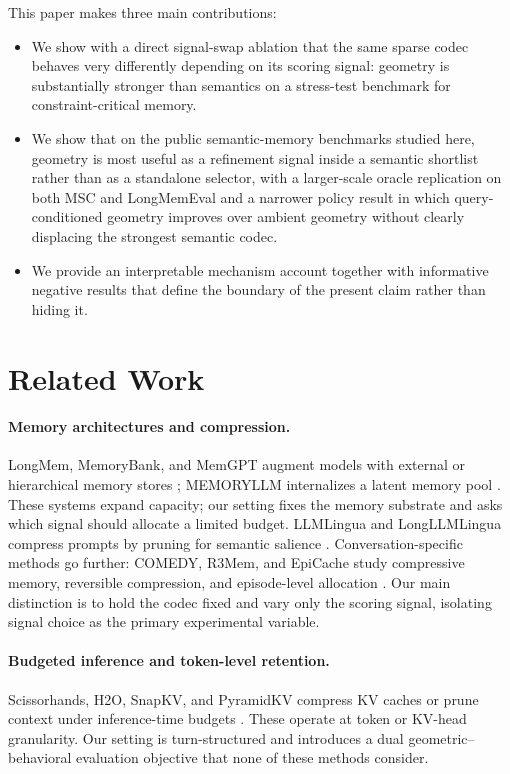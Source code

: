 \documentclass[11pt]{article}
\begin{document}
This paper makes three main contributions:
\begin{itemize}[leftmargin=1.25em]
    \item We show with a direct signal-swap ablation that the same sparse codec behaves very differently depending on its scoring signal: geometry is substantially stronger than semantics on a stress-test benchmark for constraint-critical memory.
    \item We show that on the public semantic-memory benchmarks studied here, geometry is most useful as a refinement signal inside a semantic shortlist rather than as a standalone selector, with a larger-scale oracle replication on both MSC and LongMemEval and a narrower policy result in which query-conditioned geometry improves over ambient geometry without clearly displacing the strongest semantic codec.
    \item We provide an interpretable mechanism account together with informative negative results that define the boundary of the present claim rather than hiding it.
\end{itemize}

\section{Related Work}
\paragraph{Memory architectures and compression.}
LongMem, MemoryBank, and MemGPT augment models with external or hierarchical memory stores \cite{longmem,memorybank,memgpt}; MEMORYLLM internalizes a latent memory pool \cite{memoryllm}. These systems expand capacity; our setting fixes the memory substrate and asks which signal should allocate a limited budget. LLMLingua and LongLLMLingua compress prompts by pruning for semantic salience \cite{llmlingua,longllmlingua}. Conversation-specific methods go further: COMEDY, R3Mem, and EpiCache study compressive memory, reversible compression, and episode-level allocation \cite{comedy,r3mem,epicache}. Our main distinction is to hold the codec fixed and vary only the scoring signal, isolating signal choice as the primary experimental variable.

\paragraph{Budgeted inference and token-level retention.}
Scissorhands, H2O, SnapKV, and PyramidKV compress KV caches or prune context under inference-time budgets \cite{scissorhands,h2o,snapkv,pyramidkv}. These operate at token or KV-head granularity. Our setting is turn-structured and introduces a dual geometric--behavioral evaluation objective that none of these methods consider.
\end{document}
